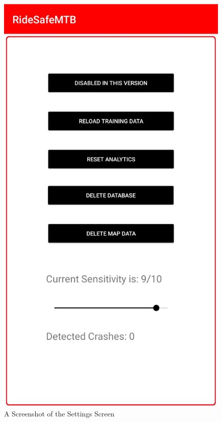 \begin{figure}
\begin{center}
\includegraphics[scale = 0.15] {implementation/set.jpg}
\end{center}
\caption{A Screenshot of the Settings Screen}
\label{set}
\end{figure}

